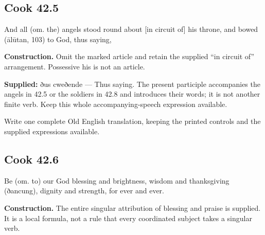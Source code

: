 \par\begin{minipage}{\linewidth}\raggedright
\subsection*{Cook 42.5}

And all (om. the) angels stood round about [in circuit of] his throne, and bowed (ālūtan, 103) to God, thus saying,

\end{minipage}\par\addvspace{4pt}

\textbf{Construction.} Omit the marked article and retain the supplied “in circuit of” arrangement. Possessive his is not an article.

\textbf{Supplied:} ðus cweðende — Thus saying. The present participle accompanies the angels in 42.5 or the soldiers in 42.8 and introduces their words; it is not another finite verb. Keep this whole accompanying-speech expression available.

Write one complete Old English translation, keeping the printed controls and the supplied expressions available.

\par\begin{minipage}{\linewidth}\raggedright
\subsection*{Cook 42.6}

Be (om. to) our God blessing and brightness, wisdom and thanksgiving (ðancung), dignity and strength, for ever and ever.

\end{minipage}\par\addvspace{4pt}

\textbf{Construction.} The entire singular attribution of blessing and praise is supplied. It is a local formula, not a rule that every coordinated subject takes a singular verb.

